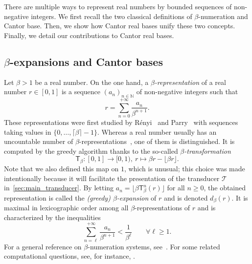 \documentclass[12pt,reqno]{amsart}
\begin{document}
There are multiple ways to represent real numbers by bounded sequences of non-negative integers. We first recall the two classical definitions of $\beta$-numeration and Cantor base. Then, we show how Cantor real bases unify these two concepts. Finally, we detail our contributions to Cantor real bases.

\subsection{\texorpdfstring{$\beta$-expansions and Cantor bases}{beta-expansions and Cantor bases}}

Let $\beta>1$ be a real number. On the one hand, a {\em $\beta$-representation} of a real number $r\in [0,1]$ is a sequence $(a_n)_{n\in\mathbb{N}}$ of non-negative integers such that 
\begin{equation}
\label{eq:beta-exp}
    r=\sum_{n=0}^{+\infty} \frac{a_n}{\beta^{n+1}}.
\end{equation} 
These representations were first studied by Rényi~\cite{Renyi1957} and Parry~\cite{Parry1960} with sequences taking values in $\{0,\ldots,\lceil \beta \rceil -1\}$. Whereas a real number usually has an uncountable number of $\beta$-representations~\cite{Sidorov2003}, one of them is distinguished. It is computed by the greedy algorithm thanks to the so-called {\em $\beta$-transformation} 
\begin{equation}
\label{eq:Tbeta}
    \mathsf{T}_{\beta}\colon [0,1]\to [0,1),\ r\mapsto \beta r-\lfloor \beta r\rfloor.
\end{equation}
Note that we also defined this map on $1$, which is unusual; this choice was made intentionally because it will facilitate the presentation of the transducer $\mathcal{T}$ in~\cref{sec:main_transducer}.
By letting $a_n=\lfloor \beta \mathsf{T}_{\beta}^n(r) \rfloor$ for all $n\ge 0$, the obtained representation is called the  \emph{(greedy) $\beta$-expansion} of $r$ and is denoted $d_{\beta}(r)$. It is maximal in lexicographic order among all $\beta$-representations of $r$ and is characterized by the inequalities
\begin{equation}
\label{eq:greedy-inequalities}
    \sum_{n=\ell}^{+\infty} \frac{a_n}{\beta^{n+1}}<\frac{1}{\beta^{\ell}}\qquad \forall\ell\ge 1.
\end{equation}
For a general reference on $\beta$-numeration systems, see~\cite[Chap.~6]{Lothaire}. For some related computational questions, see, for instance, \cite{MR3230872,MR3404455,MR2299792}.
\end{document}
